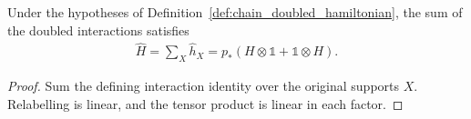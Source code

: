 \begin{lemma}
    \label{lem:chain_doubled_operator}
    \leanok
    Under the hypotheses of Definition~\ref{def:chain_doubled_hamiltonian},
    the sum of the doubled interactions satisfies
    \begin{align}
        \widehat H=\sum_X\widehat h_X
        =p_*(H\otimes\mathbb 1+\mathbb 1\otimes H).
    \end{align}
\end{lemma}
\begin{proof}
    \leanok
    Sum the defining interaction identity over the original supports $X$.
    Relabelling is linear, and the tensor product is linear in each factor.
\end{proof}

